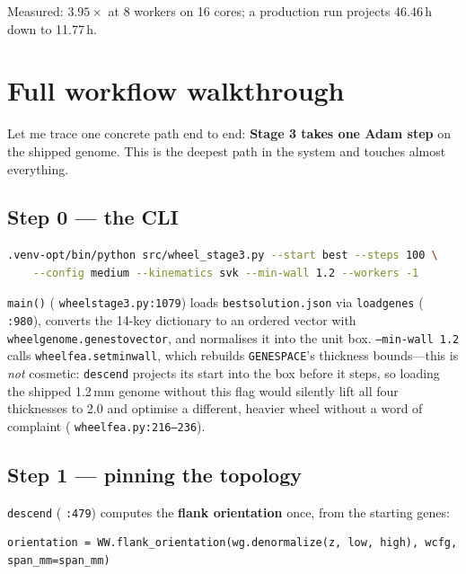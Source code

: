 \documentclass[11pt,a4paper]{article}
\DeclareRobustCommand{\code}[1]{%
  \texttt{\small\def\_{\textunderscore\discretionary{}{}{}}#1}}
\newcommand{\at}[2]{\code{#1:#2}}
\begin{document}
Measured: $3.95\times$ at 8 workers on 16 cores; a production run projects 46.46\,h down
to 11.77\,h.

\section{Full workflow walkthrough}
\label{sec:workflow}

Let me trace one concrete path end to end: \textbf{Stage 3 takes one Adam step} on the
shipped genome. This is the deepest path in the system and touches almost everything.

\subsection*{Step 0 --- the CLI}

\begin{lstlisting}[language=bash]
.venv-opt/bin/python src/wheel_stage3.py --start best --steps 100 \
    --config medium --kinematics svk --min-wall 1.2 --workers -1
\end{lstlisting}

\code{main()} (\at{wheel\_stage3.py}{1079}) loads \code{best\_solution.json} via
\code{load\_genes} (\code{:980}), converts the 14-key dictionary to an ordered vector
with \code{wheel\_genome.genes\_to\_vector}, and normalises it into the unit box.
\code{--min-wall 1.2} calls \code{wheel\_fea.set\_min\_wall}, which rebuilds
\code{GENE\_SPACE}'s thickness bounds---this is \emph{not} cosmetic: \code{descend}
projects its start into the box before it steps, so loading the shipped 1.2\,mm genome
without this flag would silently lift all four thicknesses to 2.0 and optimise a
different, heavier wheel without a word of complaint
(\at{wheel\_fea.py}{216--236}).

\subsection*{Step 1 --- pinning the topology}

\code{descend} (\code{:479}) computes the \textbf{flank orientation} once, from the
starting genes:

\begin{lstlisting}[style=py]
orientation = WW.flank_orientation(wg.denormalize(z, low, high), wcfg, span_mm=span_mm)
\end{lstlisting}
\end{document}
